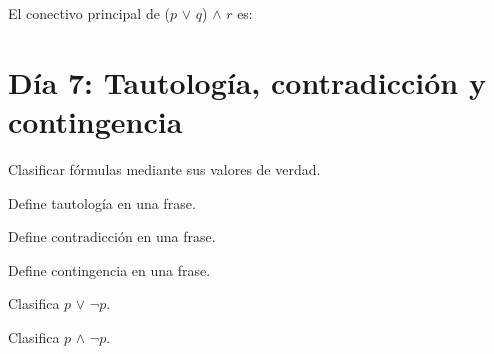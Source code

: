 \begin{activity}[id=dia-06-opcion-02,type=choice,weight=1]

El conectivo principal de (\(p\) \(\lor\) \(q\)) \(\land\) \(r\) es:





\end{activity}

\section{Día 7: Tautología, contradicción y contingencia}

\begin{lesson}[id=dia-07-lectura,weight=0]

Clasificar fórmulas mediante sus valores de verdad.

\end{lesson}

\begin{activity}[id=dia-07-corta-01,type=short,weight=1]

Define tautología en una frase.

\end{activity}

\begin{activity}[id=dia-07-corta-02,type=short,weight=1]

Define contradicción en una frase.

\end{activity}

\begin{activity}[id=dia-07-corta-03,type=short,weight=1]

Define contingencia en una frase.

\end{activity}

\begin{activity}[id=dia-07-corta-04,type=short,weight=1]

Clasifica \(p\) \(\lor\) \(\neg p\).

\end{activity}

\begin{activity}[id=dia-07-corta-05,type=short,weight=1]

Clasifica \(p\) \(\land\) \(\neg p\).

\end{activity}

